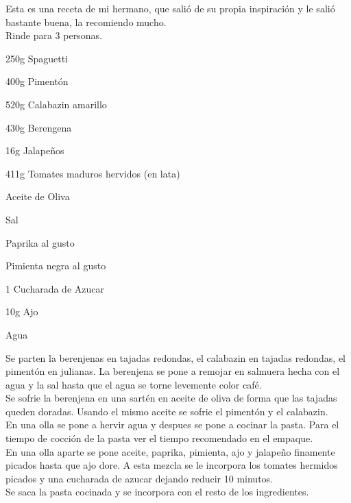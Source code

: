 
Esta es una receta de mi hermano, que salió de su propia inspiración y le salió bastante buena, la recomiendo mucho.\\

Rinde para 3 personas.\\

\begin{ingredientes}
\item 250g Spaguetti
\item 400g Pimentón
\item 520g Calabazin amarillo
\item 430g Berengena
\item 16g Jalapeños
\item 411g Tomates maduros hervidos (en lata)
\item Aceite de Oliva
\item Sal
\item Paprika al gusto
\item Pimienta negra al gusto
\item 1 Cucharada de Azucar
\item 10g Ajo
\item Agua
\end{ingredientes}
\preparacion
Se parten la berenjenas en tajadas redondas, el calabazin en tajadas redondas, el pimentón en julianas. La berenjena se pone a remojar en salmuera hecha con el agua y la sal hasta que el agua se torne levemente color café.\\

Se sofrie la berenjena en una sartén en aceite de oliva de forma que las tajadas queden doradas. Usando el mismo aceite se sofrie el pimentón y el calabazin.\\

En una olla se pone a hervir agua y despues se pone a cocinar la pasta. Para el tiempo de cocción de la pasta ver el tiempo recomendado en el empaque.\\

En una olla aparte se pone aceite, paprika, pimienta, ajo y jalapeño finamente picados  hasta que ajo dore. A esta mezcla se le incorpora los tomates hermidos picados y una cucharada de azucar dejando reducir 10 minutos.\\

Se saca la pasta cocinada y se incorpora con el resto de los ingredientes.
